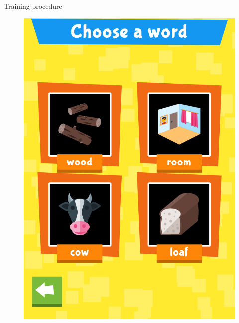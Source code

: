 \documentclass[final,xcolor={cmyk,hyperref}]{beamer}
\begin{document}
\begin{frame}[t]
\begin{columns}[t]
\begin{column}{0.4\linewidth}
\begin{block}{Training procedure}
\begin{figure}[h]
\begin{columns}
\begin{column}{\screenshotwidth}
    \includegraphics[width=\linewidth]{images/CALVin-screenshots/jpgs/choose_word}
  \end{column}
\end{columns}
\vspace*{1ex}
\begin{columns}
  \begin{column}{\screenshotwidth}

\end{column}
\end{columns}
\end{figure}
\end{block}
\end{column}
\end{columns}
\end{frame}
\end{document}

